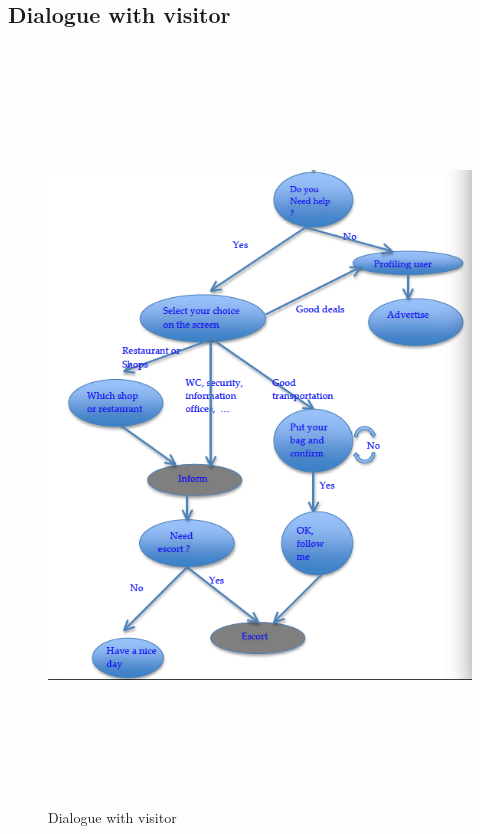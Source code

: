 \documentclass{article}
\begin{document}
\subsection{Dialogue with visitor}
\begin{figure}[htbp]
\begin{center}
\includegraphics[height=20cm]{VisitorDialogueII}
\caption{Dialogue with visitor}
\label{FigVisitorDialogue}
\end{center}
\end{figure}
\end{document}

